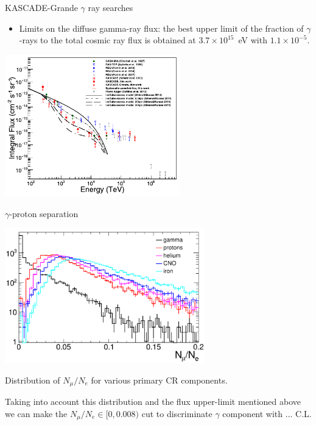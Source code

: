 \begin{frame}{KASCADE-Grande $\gamma$ ray searches}
\begin{itemize}
 \item Limits on the diffuse gamma-ray flux: the best upper limit of the fraction of $\gamma$-rays
to the total cosmic ray flux is obtained at $3.7 \times 10^{15}$~eV with $1.1 \times 10^{-5}$. 
\end{itemize}

\begin{center}
    \includegraphics[width=0.57\textwidth]{pics/KASCADE-Grande_UHECR2016-2.pdf}
\end{center}
\end{frame}

\begin{frame}{$\gamma$-proton separation}
\small
\vspace{-1em}
\begin{center}
    \includegraphics[width=0.65\textwidth]{pics/Nmu_Ne.pdf}
    
    Distribution of $N_\mu / N_e$ for various primary CR components.
\end{center}
Taking into account this distribution and the flux upper-limit mentioned above we can make the 
$N_\mu/N_e \in [0, 0.008)$ cut to discriminate $\gamma$ component with ... C.L.
\end{frame}

